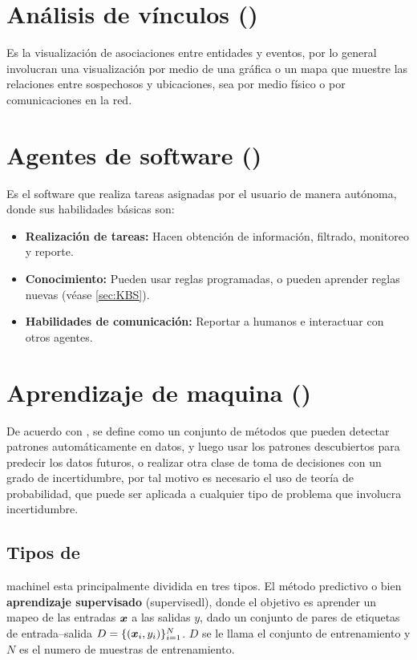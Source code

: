 
\section{Análisis de vínculos ()}
Es la visualización de asociaciones entre entidades y eventos, por lo general involucran una visualización por medio de una gráfica o un mapa que muestre las relaciones entre sospechosos y ubicaciones, sea por medio físico o por comunicaciones en la red.


\section{Agentes de software ()}
Es el software que realiza tareas asignadas por el usuario de manera autónoma, donde sus habilidades básicas son:
\begin{itemize}
\item \textbf{Realización de tareas:} Hacen obtención de información, filtrado, monitoreo y reporte.
\item \textbf{Conocimiento:} Pueden usar reglas programadas, o pueden aprender reglas nuevas (véase \ref{sec:KBS}).
\item \textbf{Habilidades de comunicación:} Reportar a humanos e interactuar con otros agentes.
\end{itemize}


\section{Aprendizaje de maquina ()} \label{sec:ML}
De acuerdo con \cite{murphymachinel}, se define como un conjunto de métodos que pueden detectar patrones automáticamente en datos, y luego usar los patrones descubiertos para predecir los datos futuros, o realizar otra clase de toma de decisiones con un grado de incertidumbre, por tal motivo es necesario el uso de teoría de probabilidad, que puede ser aplicada a cualquier tipo de problema que involucra incertidumbre.

\subsection{Tipos de }
\gls{machinel} esta principalmente dividida en tres tipos. El método predictivo o bien \textbf{aprendizaje supervisado} (\gls{supervisedl}), donde el objetivo es aprender un mapeo de las entradas ${\bm{x}}$ a las salidas $y$, dado un conjunto de pares de etiquetas de entrada--salida $D = \{({\bm{x}}_i, y_i)\}_{i=1}^{N}$. $D$ se le llama el conjunto de entrenamiento y $N$ es el numero de muestras de entrenamiento.

